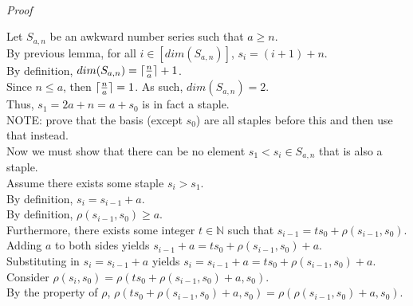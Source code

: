 \documentclass[a4paper,12pt]{article}
\DeclarePairedDelimiter{\ceil}{\lceil}{\rceil}
\begin{document}
\noindent \\
\textit{Proof}

\noindent Let $S_{a, n}$ be an awkward number series such that $a \geq n$.\\

\noindent By previous lemma, for all $i \in [dim(S_{a, n})]$, $s_i = (i + 1) + n$.\\

\noindent By definition, $dim(S_{a,n}) = \ceil{\frac{n}{a}} + 1$.\\

\noindent Since $n \leq a$, then $\ceil{\frac{n}{a}} = 1$. As such, $dim(S_{a, n}) = 2$.\\

\noindent Thus, $s_1 = 2a + n = a + s_0$ is in fact a staple.\\

\noindent NOTE: prove that the basis (except $s_0$) are all staples before this and then use that instead.\\

\noindent Now we must show that there can be no element $s_1 < s_i \in S_{a, n}$ that is also a staple.\\

\noindent Assume there exists some staple $s_i > s_1$.\\

\noindent By definition, $s_i = s_{i - 1} + a$.\\

\noindent By definition, $\rho(s_{i - 1}, s_0) \geq a$.\\

\noindent Furthermore, there exists some integer $t \in \mathbb{N}$ such that $s_{i - 1} = ts_0 + \rho(s_{i - 1}, s_0)$.\\

\noindent Adding $a$ to both sides yields $s_{i - 1} + a = ts_0 + \rho(s_{i - 1}, s_0) + a$.\\

\noindent Substituting in $s_i = s_{i - 1} + a$ yields $s_i = s_{i - 1} + a = ts_0 + \rho(s_{i - 1}, s_0) + a$.\\

\noindent Consider $\rho(s_i, s_0) = \rho(ts_0 + \rho(s_{i - 1}, s_0) + a, s_0)$.\\

\noindent By the property of $\rho$, $\rho(ts_0 + \rho(s_{i - 1}, s_0) + a, s_0) = \rho(\rho(s_{i - 1}, s_0) + a, s_0)$.\\
\end{document}
